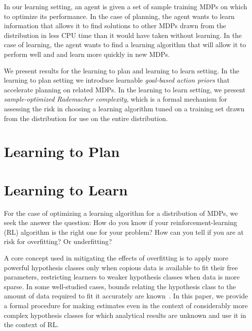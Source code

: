 In our learning setting, an agent is given a set of sample training MDPs on which to optimize its performance. In the case of planning, the agent wants to learn information that allows it to find solutions to other MDPs drawn from the distribution in less CPU time than it would have taken without learning. In the case of learning, the agent wants to find a learning algorithm that will allow it to perform well and and learn more quickly in new MDPs.

We present results for the learning to plan and learning to learn setting. In the learning to plan setting we introduce learnable \emph{goal-based action priors} that accelerate planning on related MDPs. In the learning to learn setting, we present \emph{sample-optimized Rademacher complexity},
which is a formal mechanism for assessing the risk in choosing a learning algorithm tuned on a training set drawn from the distribution for use on the entire distribution.

\section{Learning to Plan}


\section{Learning to Learn}
For the case of optimizing a learning algorithm for a distribution of MDPs, we seek the answer the question: How do you know if your reinforcement-learning (RL) algorithm is the right one for your problem? How can you tell if you are at risk for overfitting? Or underfitting?


A core concept used in mitigating the effects of overfitting is to apply more powerful hypothesis classes only when copious data is available to fit their free parameters, restricting learners to weaker hypothesis classes when data is more sparse. In some well-studied cases, bounds relating the hypothesis class to the amount of data required to fit it accurately are known~\cite{blumer1989learnability}. In this paper, we provide a formal procedure for making estimates even in the context of considerably more complex hypothesis classes for which analytical results are unknown and use it in the context of RL.

